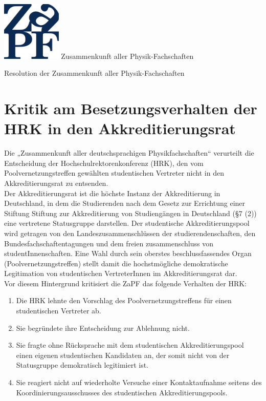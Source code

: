 \documentclass[DIV=calc]{scrartcl}
\begin{document}
\hspace{0.87\textwidth}
\begin{minipage}{120pt}
\vspace{-1.8cm}
\includegraphics[width=80pt]{logo.pdf}
\centering
\small Zusammenkunft aller Physik-Fachschaften
\end{minipage}
\begin{center}
\huge{Resolution der Zusammenkunft aller Physik-Fachschaften} \\
\normalsize
\end{center}

\vspace{1cm}
\section*{Kritik am Besetzungsverhalten der HRK in den Akkreditierungsrat}

Die „Zusammenkunft aller deutschsprachigen Physikfachschaften“ verurteilt die Entscheidung der Hochschulrektorenkonferenz (HRK), den vom Poolvernetzungstreffen gewählten studentischen Vertreter nicht in den Akkreditierungsrat zu entsenden. \\

Der Akkreditierungsrat ist die höchste Instanz der Akkreditierung in Deutschland, in dem die Studierenden nach dem  \glqq Gesetz zur Errichtung einer Stiftung \glqq Stiftung zur Akkreditierung von Studiengängen in Deutschland \grqq \grqq (\S 7 (2)) eine vertretene Statusgruppe darstellen. Der studentische Akkreditierungspool wird getragen von den Landeszusammenschlüssen der studierendenschaften, den Bundesfachschaftentagungen und dem freien zusammenschluss von studentInnenschaften. Eine Wahl durch sein oberstes beschlussfassendes Organ (Poolvernetzungstreffen) stellt damit die hochstmögliche demokratische Legitimation von studentischen VertreterInnen im Akkreditierungsrat dar. \\

Vor diesem Hintergrund kritisiert die ZaPF das folgende Verhalten der HRK:

\begin{enumerate}
	\item Die HRK lehnte den Vorschlag des Poolvernetzungstreffens für einen studentischen Vertreter ab.
	\item Sie begründete ihre Entscheidung zur Ablehnung nicht.
	\item Sie fragte ohne Rücksprache mit dem studentischen Akkreditierungspool einen eigenen studentischen Kandidaten an, der somit nicht von der Statusgruppe demokratisch legitimiert ist.
	\item Sie reagiert nicht auf wiederholte Versuche einer Kontaktaufnahme seitens des Koordinierungsausschusses des studentischen Akkreditierungspools.

\end{enumerate}
 
\end{document}
